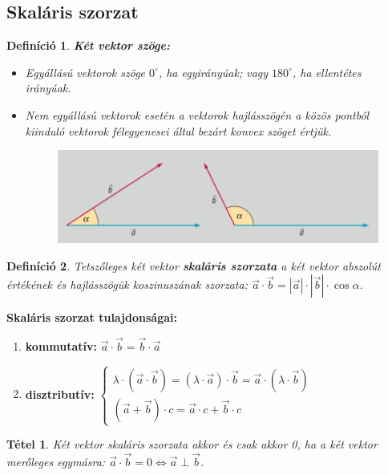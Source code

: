 \documentclass[12pt,a4paper]{article}
\newtheorem{theorem}{Tétel} [section]
\newtheorem{definition}{Definíció} [section]
\begin{document}
\subsection{Skaláris szorzat}
\begin{definition}
\textbf{Két vektor szöge:}
\begin{itemize}
\item Egyállású vektorok szöge $0^\circ$, ha egyirányúak; vagy $180^\circ$, ha ellentétes irányúak.
\item Nem egyállású vektorok esetén a vektorok hajlásszögén a közös pontból kiinduló vektorok félegyenesei által bezárt konvex szöget értjük.
\begin{figure}[h!]
\centering
\includegraphics[scale=0.3]{geometry/vektor_szog}
\end{figure}
\end{itemize}
\end{definition}
\newpage
\begin{definition}
Tetszőleges két vektor \textbf{skaláris szorzata} a két vektor abszolút értékének és hajlásszögük koszinuszának szorzata: $\vec{a}\cdot \vec{b}=|\vec{a}|\cdot|\vec{b}|\cdot\cos \alpha$.
\end{definition}

\textbf{Skaláris szorzat tulajdonságai:}
\begin{enumerate}
\item \textbf{kommutatív:} $\vec{a}\cdot \vec{b}=\vec{b}\cdot \vec{a}$
\item \textbf{disztributív:} $\begin{cases}\lambda\cdot(\vec{a}\cdot\vec{b})=(\lambda\cdot\vec{a})\cdot\vec{b}=\vec{a}\cdot(\lambda\cdot\vec{b})\\(\vec{a}+\vec{b})\cdot c =\vec{a}\cdot c +\vec{b}\cdot c  \end{cases}$
\end{enumerate}

\begin{theorem}
Két vektor skaláris szorzata akkor és csak akkor 0, ha a két vektor merőleges egymásra: $\vec{a}\cdot\vec{b}=0\Leftrightarrow \vec{a}\perp \vec{b}$.
\end{theorem}
\end{document}
